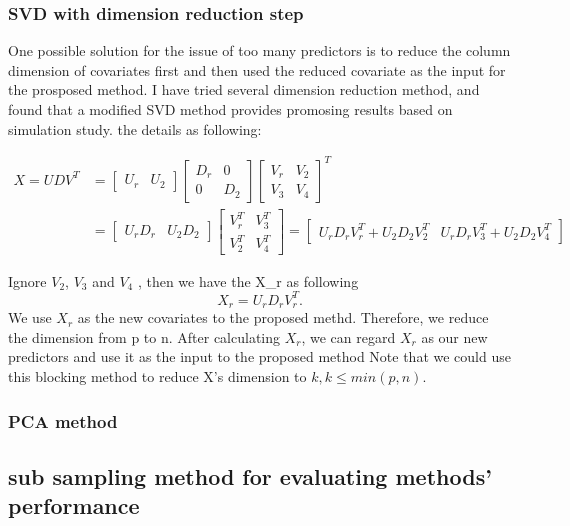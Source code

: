\documentclass[]{article}
\begin{document}
\subsubsection{SVD with dimension reduction
step}\label{svd-with-dimension-reduction-step}

One possible solution for the issue of too many predictors is to reduce
the column dimension of covariates first and then used the reduced
covariate as the input for the prosposed method. I have tried several
dimension reduction method, and found that a modified SVD method
provides promosing results based on simulation study. the details as
following:

\begin{align*}
  X = U D V^T &= \begin{bmatrix}
                      U_r & U_2
                      \end{bmatrix}
                      \begin{bmatrix}
                      D_r & 0\\
                      0 & D_2
                      \end{bmatrix}
                      \begin{bmatrix}
                      V_r & V_2\\
                      V_3 & V_4
                      \end{bmatrix}^T \\ 
              &= 
                      \begin{bmatrix}
                      U_rD_r & U_2D_2
                      \end{bmatrix}
                      \begin{bmatrix}
                      V_r^T & V_3^T\\
                      V_2^T & V_4^T
                      \end{bmatrix}
                      =
                      \begin{bmatrix}
                      U_rD_rV_r^T + U_2D_2V_2^T & U_rD_rV_3^T + U_2D_2 V_4^T
                      \end{bmatrix}
\end{align*}

Ignore \(V_2\), \(V_3\) and \(V_4\) , then we have the X\_r as following
\[
  X_r = U_rD_rV_r^T.
\] We use \(X_r\) as the new covariates to the proposed methd.
Therefore, we reduce the dimension from p to n. After calculating
\(X_r\), we can regard \(X_r\) as our new predictors and use it as the
input to the proposed method Note that we could use this blocking method
to reduce X's dimension to \(k, k \leq min(p,n)\).

\subsubsection{PCA method}\label{pca-method}

\subsection{sub sampling method for evaluating methods'
performance}\label{sub-sampling-method-for-evaluating-methods-performance}
\end{document}
